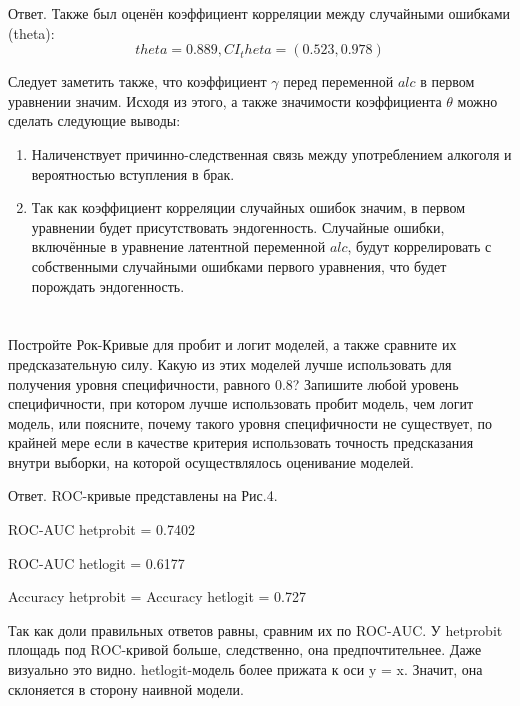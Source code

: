 \documentclass[a4paper,12pt]{article}
\begin{document}
Ответ. Также был оценён коэффициент корреляции между случайными ошибками (theta):
\[ theta = 0.889, CI_theta = (0.523,0.978) \]

Следует заметить также, что коэффициент $ \gamma $ перед переменной $ alc $  в первом уравнении значим. Исходя из этого, а также значимости коэффициента $ \theta $ можно сделать следующие выводы:

\begin{enumerate}[\Sun]
	\item Наличенствует причинно-следственная связь между употреблением алкоголя и вероятностью вступления в брак.
	
	\item Так как коэффициент корреляции случайных ошибок значим, в первом уравнении будет присутствовать эндогенность. Случайные ошибки, включённые в уравнение латентной переменной $ alc $, будут коррелировать с собственными случайными ошибками первого уравнения, что будет порождать эндогенность.
	
	
\end{enumerate}


\section{}
\subsection{}
\Sun  Постройте Рок-Кривые для пробит и логит моделей, а также сравните их
предсказательную силу. Какую из этих моделей лучше использовать для получения
уровня специфичности, равного 0.8? Запишите любой уровень специфичности, при
котором лучше использовать пробит модель, чем логит модель, или поясните, почему
такого уровня специфичности не существует, по крайней мере если в качестве критерия
использовать точность предсказания внутри выборки, на которой осуществлялось
оценивание моделей.

Ответ. ROC-кривые представлены на Рис.4.

ROC-AUC hetprobit = 0.7402

ROC-AUC hetlogit = 0.6177

Accuracy hetprobit = Accuracy hetlogit = 0.727

Так как доли правильных ответов равны, сравним их по ROC-AUC. У hetprobit площадь под ROC-кривой больше, следственно, она предпочтительнее. Даже визуально это видно. hetlogit-модель более прижата к оси y = x. Значит, она склоняется в сторону наивной модели. 
\end{document}
